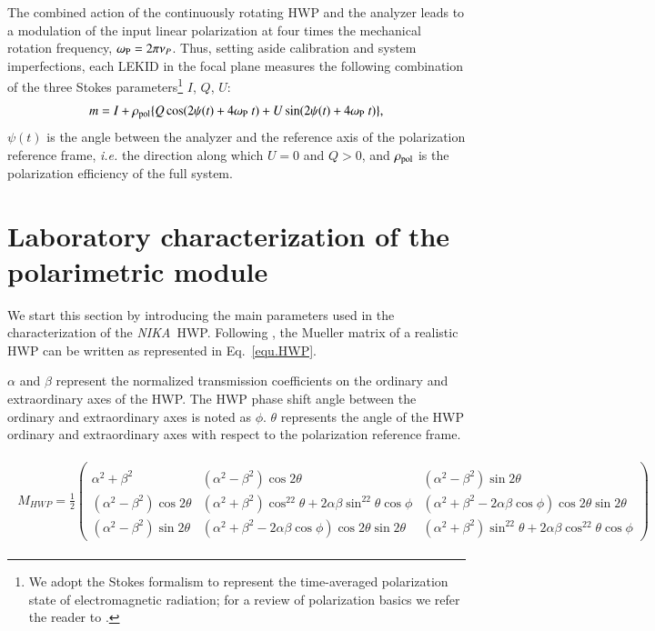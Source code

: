 \documentclass[twocolumn, traditabstract]{aa}
\newcommand{\nika}{{\it NIKA}}
\begin{document}
The combined action of the continuously rotating HWP and the analyzer leads to a
modulation of the input linear polarization at four times the mechanical
rotation frequency, $\omega_{\rm P} = 2 \pi \nu_{P}$. Thus, setting aside
calibration and system imperfections, each LEKID in the focal plane measures the
following combination of the three Stokes parameters\footnote{We adopt the Stokes formalism to represent the time-averaged polarization state of electromagnetic radiation; for a review of polarization basics we refer the reader to \cite{1992plfa.book.....C}.} $I$, $Q$, $U$:
\begin{equation}
m = I + \rho_{\rm pol} \lbrace Q \cos ( 2 \psi(t) + 4 \omega_{\rm P} \ t) + U \sin ( 2\psi(t) + 4 \omega_{\rm P} \ t) \rbrace,
\label{photoequ}
\end{equation}
$\psi(t)$ is the angle between the analyzer and the reference axis of the polarization reference
frame, {\it i.e.} the direction along which $U=0$ and $Q>0$, and 
$\rho_{\rm pol}$ is the polarization efficiency of the full system. 
\section{Laboratory characterization of the polarimetric module}
\label{lab_characterization}
We start this section by introducing the main parameters used in the
characterization of the \nika\ HWP. Following \citet{savini2006}, the
Mueller matrix of a realistic HWP can be written as represented in Eq.~\ref{equ.HWP}.

\noindent $\alpha$ and $\beta$ represent the normalized
transmission coefficients on the ordinary and extraordinary axes of the HWP.
The HWP phase shift angle between the ordinary and extraordinary axes is noted
as $\phi$.  $\theta$ represents the angle of the HWP ordinary and extraordinary
axes with respect to the polarization reference frame.

 \begin{widetext}
 \begin{eqnarray} \label{equ.HWP}
   \begin{split}
      M_{HWP}=\frac{1}{2} \left(\begin{array}{lll} \\
        \alpha^2+\beta^2              & (\alpha^2-\beta^2)\cos2\theta & (\alpha^2-\beta^2)\sin2\theta \\
        (\alpha^2-\beta^2)\cos2\theta & (\alpha^2+\beta^2)\cos^22\theta +
        2\alpha\beta\sin^22\theta\cos\phi &
        (\alpha^2+\beta^2-2\alpha\beta\cos\phi)\cos2\theta\sin2\theta \\
        (\alpha^2-\beta^2)\sin2\theta &
        (\alpha^2+\beta^2-2\alpha\beta\cos\phi)\cos2\theta\sin2\theta &
        (\alpha^2+\beta^2)\sin^22\theta + 2\alpha\beta\cos^22\theta\cos\phi
      \end{array}\right)
   \end{split}
  \end{eqnarray}
\end{widetext}
\end{document}

